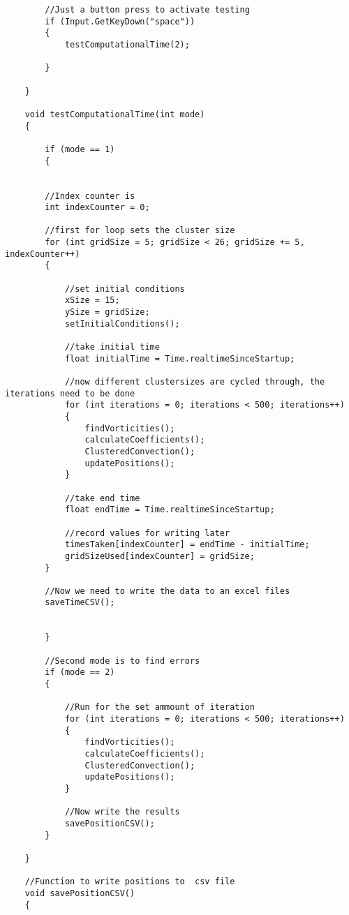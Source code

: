 \begin{mdframed}[linecolor=black, topline=true, bottomline=true,
  leftline=false, rightline=false]
\begin{verbatim}
        //Just a button press to activate testing
        if (Input.GetKeyDown("space"))
        {
            testComputationalTime(2);

        }

    }

    void testComputationalTime(int mode)
    {

        if (mode == 1)
        {


        //Index counter is
        int indexCounter = 0;

        //first for loop sets the cluster size
        for (int gridSize = 5; gridSize < 26; gridSize += 5, indexCounter++)
        {

            //set initial conditions
            xSize = 15;
            ySize = gridSize;
            setInitialConditions();

            //take initial time
            float initialTime = Time.realtimeSinceStartup;

            //now different clustersizes are cycled through, the iterations need to be done
            for (int iterations = 0; iterations < 500; iterations++)
            {
                findVorticities();
                calculateCoefficients();
                ClusteredConvection();
                updatePositions();
            }

            //take end time
            float endTime = Time.realtimeSinceStartup;

            //record values for writing later
            timesTaken[indexCounter] = endTime - initialTime;
            gridSizeUsed[indexCounter] = gridSize;
        }

        //Now we need to write the data to an excel files
        saveTimeCSV();


        }

        //Second mode is to find errors
        if (mode == 2)
        {

            //Run for the set ammount of iteration
            for (int iterations = 0; iterations < 500; iterations++)
            {
                findVorticities();
                calculateCoefficients();
                ClusteredConvection();
                updatePositions();
            }

            //Now write the results
            savePositionCSV();
        }

    }

    //Function to write positions to  csv file
    void savePositionCSV()
    {



\end{verbatim}
\end{mdframed}
